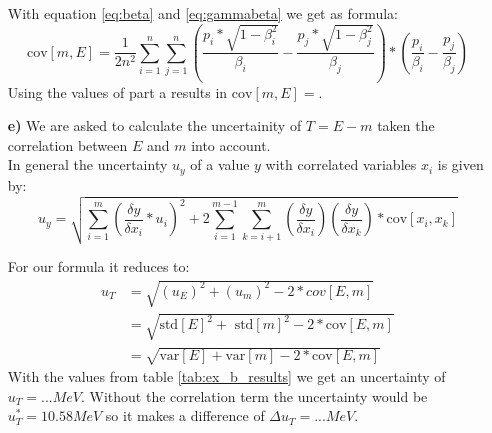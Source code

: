 \documentclass[10pt]{article}
\newenvironment{myfont}{\fontfamily{put}\selectfont}{\par}
\begin{document}
\begin{myfont}
\begin{itemize}
   With equation \ref{eq:beta} and \ref{eq:gammabeta} we get as formula:
   \begin{equation}
   \textrm{cov}[m, E] = \frac{1}{2n^2} \sum_{i=1}^n \sum_{j=1}^n \left(\frac{p_i*\sqrt{1- \beta_i^2}}{\beta_i} -  \frac{p_j*\sqrt{1- \beta_j^2}}{\beta_j}\right)* \left(\frac{p_i}{\beta_i} - \frac{p_j}{\beta_j} \right)
   \end{equation}
   Using the values of part a results in $\textrm{cov}[m, E] = $.
  

  \item[\textbf{e)}] \label{part_e}
    We are asked to calculate the uncertainity of $T = E - m$ taken the correlation between $E$ and $m$ into account. \\
    In general the uncertainty $u_y$ of a value $y$ with correlated variables $x_i$ is given by:
   \begin{equation}
    u_y = \sqrt{\sum_{i=1}^m  \left(\frac{\delta y}{\delta x_i}*u_i\right)^2 + 2 \sum_{i=1}^{m-1} \sum_{k=i+1}^{m}  \left(\frac{\delta y}{\delta x_i}\right)  \left(\frac{\delta y}{\delta x_k}\right)*\textrm{cov}[x_i, x_k]}
   \end{equation}
   
   For our formula it reduces to:
  \begin{align}
    u_T &= \sqrt{ (u_E)^2 + (u_m)^2 - 2*cov[E, m]} \\
           &= \sqrt{ \textrm{std}[E]^2 +\textrm{ std}[m]^2 - 2*\textrm{cov}[E, m]} \\
           &= \sqrt{\textrm{var}[E] + \textrm{var}[m] - 2*\textrm{cov}[E, m]} 
   \end{align}
  With the values from table \ref{tab:ex_b_results} we get an uncertainty of $u_T = ... MeV$. Without the correlation term the uncertainty would be         $u_T^* = 10.58 MeV$ so it makes a difference of $\Delta u_T = ... MeV$.
   
\end{itemize}

\end{myfont}
\end{document}
